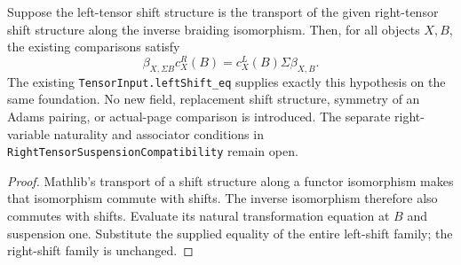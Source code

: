 \begin{proposition}
  \label{prop:h6-braiding-from-tensor-input}
  \leanok
  Suppose the left-tensor shift structure is the transport of the given
  right-tensor shift structure along the inverse braiding isomorphism.
  Then, for all objects $X,B$, the existing comparisons satisfy
  \[
    \beta_{X,\Sigma B}c_X^R(B)=c_X^L(B)\Sigma\beta_{X,B}.
  \]
  The existing \texttt{TensorInput.leftShift\_eq} supplies exactly this
  hypothesis on the same foundation. No new field, replacement shift
  structure, symmetry of an Adams pairing, or actual-page comparison is
  introduced. The separate right-variable naturality and associator
  conditions in \texttt{RightTensorSuspensionCompatibility} remain open.
\end{proposition}
\begin{proof}
  Mathlib's transport of a shift structure along a functor isomorphism
  makes that isomorphism commute with shifts. The inverse isomorphism
  therefore also commutes with shifts. Evaluate its natural transformation
  equation at $B$ and suspension one. Substitute the supplied equality
  of the entire left-shift family; the right-shift family is unchanged.
  \leanok
\end{proof}

